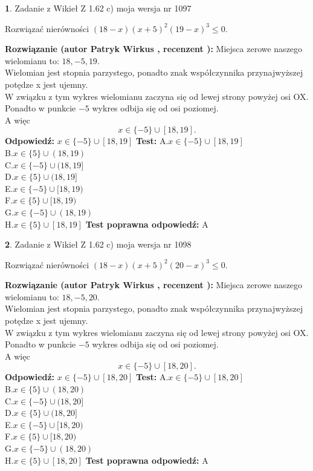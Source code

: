 \documentclass[12pt, a4paper]{article}
\theoremstyle{definition} %
\newtheorem{zad}{}
\newcommand{\zadStart}[1]{\begin{zad}#1\newline}
\newcommand{\zadStop}{\end{zad}}
\newcommand{\rozwStart}[2]{\noindent \textbf{Rozwiązanie (autor #1 , recenzent #2): }\newline}
\newcommand{\rozwStop}{\newline}
\newcommand{\odpStart}{\noindent \textbf{Odpowiedź:}\newline}
\newcommand{\odpStop}{\newline}
\newcommand{\testStart}{\noindent \textbf{Test:}\newline}
\newcommand{\testStop}{\newline}
\newcommand{\kluczStart}{\noindent \textbf{Test poprawna odpowiedź:}\newline}
\newcommand{\kluczStop}{\newline}
\begin{document}
\zadStart{Zadanie z Wikieł Z 1.62 c) moja wersja nr 1097}

Rozwiązać nierówności $(18-x)(x+5)^{2}(19-x)^{3}\le0$.
\zadStop
\rozwStart{Patryk Wirkus}{}
Miejsca zerowe naszego wielomianu to: $18, -5, 19$.\\
Wielomian jest stopnia parzystego, ponadto znak współczynnika przy\linebreak najwyższej potędze x jest ujemny.\\ W związku z tym wykres wielomianu zaczyna się od lewej strony powyżej osi OX.\\
Ponadto w punkcie $-5$ wykres odbija się od osi poziomej.\\
A więc $$x \in \{-5\} \cup [18,19].$$
\rozwStop
\odpStart
$x \in \{-5\} \cup [18,19]$
\odpStop
\testStart
A.$x \in \{-5\} \cup [18,19]$\\
B.$x \in \{5\} \cup (18,19)$\\
C.$x \in \{-5\} \cup (18,19]$\\
D.$x \in \{5\} \cup (18,19]$\\
E.$x \in \{-5\} \cup [18,19)$\\
F.$x \in \{5\} \cup [18,19)$\\
G.$x \in \{-5\} \cup (18,19)$\\
H.$x \in \{5\} \cup [18,19]$
\testStop
\kluczStart
A
\kluczStop



\zadStart{Zadanie z Wikieł Z 1.62 c) moja wersja nr 1098}

Rozwiązać nierówności $(18-x)(x+5)^{2}(20-x)^{3}\le0$.
\zadStop
\rozwStart{Patryk Wirkus}{}
Miejsca zerowe naszego wielomianu to: $18, -5, 20$.\\
Wielomian jest stopnia parzystego, ponadto znak współczynnika przy\linebreak najwyższej potędze x jest ujemny.\\ W związku z tym wykres wielomianu zaczyna się od lewej strony powyżej osi OX.\\
Ponadto w punkcie $-5$ wykres odbija się od osi poziomej.\\
A więc $$x \in \{-5\} \cup [18,20].$$
\rozwStop
\odpStart
$x \in \{-5\} \cup [18,20]$
\odpStop
\testStart
A.$x \in \{-5\} \cup [18,20]$\\
B.$x \in \{5\} \cup (18,20)$\\
C.$x \in \{-5\} \cup (18,20]$\\
D.$x \in \{5\} \cup (18,20]$\\
E.$x \in \{-5\} \cup [18,20)$\\
F.$x \in \{5\} \cup [18,20)$\\
G.$x \in \{-5\} \cup (18,20)$\\
H.$x \in \{5\} \cup [18,20]$
\testStop
\kluczStart
A
\kluczStop
\end{document}
